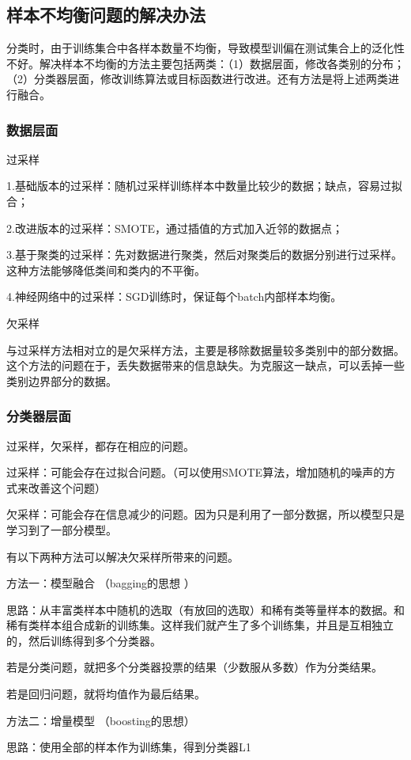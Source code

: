 \documentclass[18pt,a4paper,oneside,UTF8]{ctexart}
\begin{document}
\subsection{样本不均衡问题的解决办法}
分类时，由于训练集合中各样本数量不均衡，导致模型训偏在测试集合上的泛化性不好。解决样本不均衡的方法主要包括两类：（1）数据层面，修改各类别的分布；（2）分类器层面，修改训练算法或目标函数进行改进。还有方法是将上述两类进行融合。
\subsubsection{数据层面}

过采样

    1.基础版本的过采样：随机过采样训练样本中数量比较少的数据；缺点，容易过拟合；

    2.改进版本的过采样：SMOTE，通过插值的方式加入近邻的数据点；

    3.基于聚类的过采样：先对数据进行聚类，然后对聚类后的数据分别进行过采样。这种方法能够降低类间和类内的不平衡。

    4.神经网络中的过采样：SGD训练时，保证每个batch内部样本均衡。

    欠采样

与过采样方法相对立的是欠采样方法，主要是移除数据量较多类别中的部分数据。这个方法的问题在于，丢失数据带来的信息缺失。为克服这一缺点，可以丢掉一些类别边界部分的数据。
\subsubsection{分类器层面}
过采样，欠采样，都存在相应的问题。

过采样：可能会存在过拟合问题。（可以使用SMOTE算法，增加随机的噪声的方式来改善这个问题）

欠采样：可能会存在信息减少的问题。因为只是利用了一部分数据，所以模型只是学习到了一部分模型。

有以下两种方法可以解决欠采样所带来的问题。

方法一：模型融合 （bagging的思想 ）

思路：从丰富类样本中随机的选取（有放回的选取）和稀有类等量样本的数据。和稀有类样本组合成新的训练集。这样我们就产生了多个训练集，并且是互相独立的，然后训练得到多个分类器。

若是分类问题，就把多个分类器投票的结果（少数服从多数）作为分类结果。

若是回归问题，就将均值作为最后结果。

方法二：增量模型 （boosting的思想）

思路：使用全部的样本作为训练集，得到分类器L1
\end{document}
